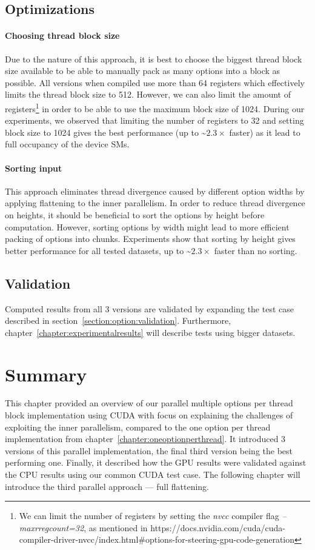 \subsection*{Optimizations}
\label{chapter:cudamulti:optimizations}
\paragraph{Choosing thread block size}
Due to the nature of this approach, it is best to choose the biggest thread block size available to be able to manually pack as many options into a block as possible. All versions when compiled use more than 64 registers which effectively limits the thread block size to 512. However, we can also limit the amount of registers\footnote{We can limit the number of registers by setting the \textit{nvcc} compiler flag \textit{--maxrregcount=32}, as mentioned in https://docs.nvidia.com/cuda/cuda-compiler-driver-nvcc/index.html#options-for-steering-gpu-code-generation} in order to be able to use the maximum block size of 1024. During our experiments, we observed that limiting the number of registers to 32 and setting block size to 1024 gives the best performance (up to \textasciitilde$2.3\times$ faster) as it lead to full occupancy of the device SMs.

\paragraph{Sorting input}
This approach eliminates thread divergence caused by different option widths by applying flattening to the inner parallelism. In order to reduce thread divergence on heights, it should be beneficial to sort the options by height before computation. However, sorting options by width might lead to more efficient packing of options into chunks. Experiments show that sorting by height gives better performance for all tested datasets, up to \textasciitilde$2.3\times$ faster than no sorting.

\subsection*{Validation}
Computed results from all 3 versions are validated by expanding the test case described in section~\ref{section:option:validation}. Furthermore, chapter~\ref{chapter:experimentalresults} will describe tests using bigger datasets.

\section*{Summary}
This chapter provided an overview of our parallel multiple options per thread block implementation using CUDA with focus on explaining the challenges of exploiting the inner parallelism, compared to the one option per thread implementation from chapter~\ref{chapter:oneoptionperthread}. It introduced 3 versions of this parallel implementation, the final third version being the best performing one. Finally, it described how the GPU results were validated against the CPU results using our common CUDA test case. The following chapter will introduce the third parallel approach --- full flattening.